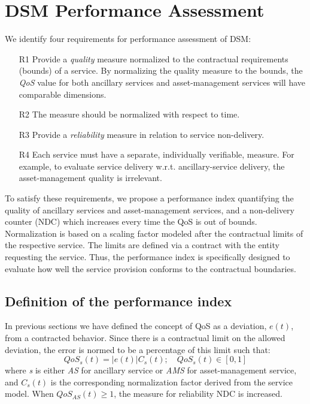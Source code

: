 \section{DSM Performance Assessment} %
\label{sec:index}
We identify four requirements for performance assessment of DSM:
\begin{itemize}
	\item[R1] Provide a \emph{quality} measure normalized to the contractual requirements (bounds) of a service. By normalizing the quality measure to the bounds, the \emph{QoS} value for both ancillary services and asset-management services will have comparable dimensions.
	\item[R2] The measure should be normalized with respect to time.
	\item[R3] Provide a \emph{reliability} measure in relation to service non-delivery.
	\item[R4] Each service must have a separate, individually verifiable, measure. For example, to evaluate service delivery w.r.t. ancillary-service delivery, the asset-management quality is irrelevant.
\end{itemize}

To satisfy these requirements, we propose a performance index quantifying the quality of ancillary services and asset-management services, and a non-delivery counter (NDC) which increases every time the QoS is out of bounds. Normalization is based on a scaling factor modeled after the contractual limits of the respective service. The limits are defined via a contract with the entity requesting the service. Thus, the performance index is specifically designed to evaluate how well the service provision conforms to the contractual boundaries.
	\subsection{Definition of the performance index}
	In previous sections we have defined the concept of QoS as a deviation, $e(t)$, from a contracted behavior. Since there is a contractual limit on the allowed deviation, the error is normed to be a percentage of this limit such that:
	\begin{equation}
		QoS_{s}(t)=|e(t)|C_{s}(t); \quad  QoS_{s}(t)\in [0,1]
	\end{equation}
	where \emph{s} is either \emph{AS} for ancillary service or \emph{AMS} for asset-management service, and $C_s(t)$ is the corresponding normalization factor derived from the service model. When $QoS_{AS}(t) \geq 1$, the measure for reliability NDC is increased. %

